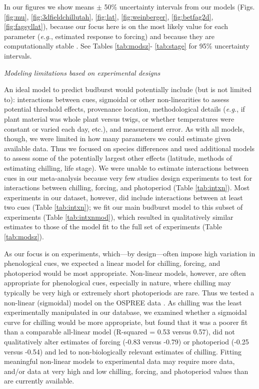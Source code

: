 \documentclass{article}
\begin{document}
In our figures  we show means $\pm$ 50\% uncertainty intervals from our models (Figs. \ref{fig:mu}, \ref{fig:3dfieldchillutah}, \ref{fig:lat}, \ref{fig:weinberger}, \ref{fig:betfag2d}, \ref{fig:fagsyllat}), because our focus here is on the most likely value for each parameter (\emph{e.g.}, estimated response to forcing) and because they are computationally stable \emph{\citep{Carpenter:2016aa,BDA}}. See Tables \ref{tab:modsz}- \ref{tab:stage} for 95\% uncertainty intervals. 

\noindent \emph{Modeling limitations based on experimental designs}
\par An ideal model to predict budburst would potentially include (but is not limited to): interactions between cues, sigmoidal or other non-linearities to assess potential threshold effects, provenance location, methodological details (\emph{e.g.}, if plant material was whole plant versus twigs, or whether temperatures were constant or varied each day, etc.), and measurement error. As with all models, though, we were limited in how many parameters we could estimate given available data. Thus we focused on species differences and used additional models to assess some of the potentially largest other effects (latitude, methods of estimating chilling, life stage). We were unable to estimate interactions between cues in our meta-analysis because very few studies design experiments to test for interactions between chilling, forcing, and photoperiod (Table \ref{tab:intxn}). Most experiments in our dataset, however, did include interactions between at least two cues (Table \ref{tab:intxn}); we fit our main budburst model to this subset of experiments (Table \ref{tab:intxnmod}), which resulted in qualitatively similar estimates to those of the model fit to the full set of experiments (Table \ref{tab:modsz}).
\par As our focus is on experiments, which---by design---often impose high variation in phenological cues, we expected a linear model for chilling, forcing, and photoperiod would be most appropriate. Non-linear models, however, are often appropriate for phenological cues, especially in nature, where chilling may typically be very high or extremely short photoperiods are rare. Thus we tested a non-linear (sigmoidal) model on the OSPREE data \emph{\citep{pmp}}. As chilling was the least experimentally manipulated in our database, we examined whether a sigmoidal curve for chilling would be more appropriate, but found that it was a poorer fit than a comparable all-linear model (R-squared = 0.53 versus 0.57), did not qualitatively alter estimates of forcing (-0.83 versus -0.79) or photoperiod (-0.25 versus -0.54) and led to non-biologically relevant estimates of chilling. Fitting meaningful non-linear models to experimental data may require more data, and/or data at very high and low chilling, forcing, and photoperiod values than are currently available. 
\end{document}
